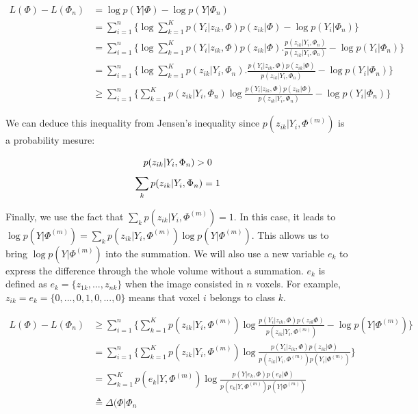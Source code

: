  
  \begin{align*}
  L(\Phi)-L(\Phi_n) &=\operatorname*{log} p(Y|\Phi) -\operatorname*{log} p(Y|\Phi_n)\\
                    &=\sum_{i=1}^n\{\operatorname*{log} \sum_{k=1}^K p(Y_i|z_{ik},\Phi)p(z_{ik}|\Phi)-\operatorname*{log} p(Y_i|\Phi_n)\}\\
                    &=\sum_{i=1}^n\{\operatorname*{log} \sum_{k=1}^K p(Y_i|z_{ik},\Phi)p(z_{ik}|\Phi).\frac{p(z_{ik}|Y_i,\Phi_n)}{p(z_{ik}|Y_i,\Phi_n)}-\operatorname*{log} p(Y_i|\Phi_n)\}\\
                    &=\sum_{i=1}^n\{\operatorname*{log} \sum_{k=1}^K p(z_{ik}|Y_i,\Phi_n).\frac{p(Y_i|z_{ik},\Phi)p(z_{ik}|\Phi)}{p(z_{ik}|Y_i,\Phi_n)}-\operatorname*{log} p(Y_i|\Phi_n)\}\\
                    &\geq \sum_{i=1}^n\{\sum_{k=1}^K p(z_{ik}|Y_i,\Phi_n)\operatorname*{log} \frac{p(Y_i|z_{ik},\Phi)p(z_{ik}|\Phi)}{p(z_{ik}|Y_i,\Phi_n)}-\operatorname*{log} p(Y_i|\Phi_n)\}
  \end{align*}

We can deduce this inequality from Jensen's inequality since  $p(z_{ik}|Y_i,\Phi^{(m)})$ is a probability mesure: 

  \begin{equation*}
  p(z_{ik}|Y_i,\Phi_n)>0\\
  \end{equation*}
  \begin{equation*}
  \sum_k p(z_{ik}|Y_i,\Phi_n)=1\\
  \end{equation*}

Finally, we use the fact that  $\sum_k p(z_{ik}|Y_i,\Phi^{(m)})=1$. In this case, it leads to $\operatorname*{log} p(Y|\Phi^{(m)})=\sum_k p(z_{ik}|Y_i,\Phi^{(m)})\operatorname*{log} p(Y|\Phi^{(m)})$. This allows us to bring $\operatorname*{log} p(Y|\Phi^{(m)})$ into the summation. 
We will also use a new variable $e_k$ to express the difference through the whole volume without a summation. $e_k$ is defined as $e_k=\{z_{1k}, ..., z_{nk}\}$ when the image consisted in $n$ voxels. For example, $z_{ik}=e_k=\{0,...,0,1,0,...,0\}$ means that voxel $i$ belongs to class $k$.

  \begin{align*}
  L(\Phi)-L(\Phi_n) &\geq \sum_{i=1}^n\{\sum_{k=1}^K p(z_{ik}|Y_i,\Phi^{(m)})\operatorname*{log} \frac{p(Y_i|z_{ik},\Phi)p(z_{ik}\Phi)}{p(z_{ik}|Y_i,\Phi^{(m)})}-\operatorname*{log} p(Y|\Phi^{(m)})\} \\
                    &=\sum_{i=1}^n\{\sum_{k=1}^K   p(z_{ik}|Y_i,\Phi^{(m)})\operatorname*{log} \frac{p(Y_i|z_{ik},\Phi)p(z_{ik}|\Phi)}{p(z_{ik}|Y_i,\Phi^{(m)})p(Y_i|\Phi^{(m)})}\}\\
                    &=\sum_{k=1}^K   p(e_{k}|Y,\Phi^{(m)})\operatorname*{log} \frac{p(Y|e_{k},\Phi)p(e_{k}|\Phi)}{p(e_{k}|Y,\Phi^{(m)})p(Y|\Phi^{(m)})}\\
                    &\triangleq \Delta(\Phi|\Phi_n
  \end{align*}

